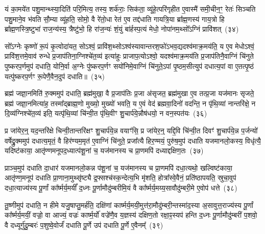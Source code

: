 यं का॒मये॑त पशु॒मान्थ्स्या॒दिति॑ परि॒मित्य॒ तस्य॒ शर्क॑राः॒ सिक॑ता॒ व्यू॑हे॒त्परि॑गृहीत ए॒वास्मै॑ समी॒चीन॒ꣳ॒ रेतः॑ सिञ्चति पशु॒माने॒व भ॑वति सौ॒म्या व्यू॑हति॒ सोमो॒ वै रे॑तो॒धा रेत॑ ए॒व तद्द॑धाति गायत्रि॒या ब्रा᳚ह्म॒णस्य॑ गाय॒त्रो हि ब्रा᳚ह्म॒णस्त्रि॒ष्टुभा॑ राज॒न्य॑स्य॒ त्रैष्टु॑भो॒ हि रा॑ज॒न्यः॑ शं॒युं बा॑र्\mbox{}हस्प॒त्यं मेधो॒ नोपा॑नम॒थ्सो᳚\-ऽग्निं प्रावि॑शत्~(३४)

सो᳚\-ऽग्नेः कृष्णो॑ रू॒पं कृ॒त्वोदा॑यत॒ सो\-ऽश्वं॒ प्रावि॑श॒थ्सो\-ऽश्व॑स्यावान्तरश॒फो॑\-ऽभव॒द्यदश्व॑माक्र॒मय॑ति॒ य ए॒व मेधो\-ऽश्वं॒ प्रावि॑श॒त्तमे॒वाव॑ रुन्धे प्र॒जा\-प॑तिना॒ग्निश्चे॑त॒व्य॑ इत्या॑हुः प्राजाप॒त्यो\-ऽश्वो॒ यदश्व॑माक्र॒मय॑ति प्र॒जा\-प॑तिनै॒वाग्निं चि॑नुते पुष्करप॒र्णमुप॑ दधाति॒ योनि॒र्वा अ॒ग्नेः पु॑ष्करप॒र्णꣳ सयो॑निमे॒वाग्निं चि॑नुते॒\-ऽपां पृ॒ष्ठम॒सीत्युप॑ दधात्य॒पां वा ए॒तत्पृ॒ष्ठं यत्पु॑ष्करप॒र्णꣳ रू॒पेणै॒वैन॒दुप॑ दधाति॥~(३५)

{\anuvakamend[{इन्द्रः॑ प॒शुका॑मस्य भवत्यविश॒थ्सयो॑निं विꣳश॒तिश्च॑}]}%

ब्रह्म॑ जज्ञा॒नमिति॑ रु॒क्ममुप॑ दधाति॒ ब्रह्म॑मुखा॒ वै प्र॒जा\-प॑तिः प्र॒जा अ॑सृजत॒ ब्रह्म॑मुखा ए॒व तत्प्र॒जा यज॑मानः सृजते॒ ब्रह्म॑ जज्ञा॒नमित्या॑ह॒ तस्मा᳚द्ब्राह्म॒णो मुख्यो॒ मुख्यो॑ भवति॒ य ए॒वं वेद॑ ब्रह्मवा॒दिनो॑ वदन्ति॒ न पृ॑थि॒व्यां नान्तरि॑क्षे॒ न दि॒व्य॑ग्निश्चे॑त॒व्य॑ इति॒ यत्पृ॑थि॒व्यां चि॑न्वी॒त पृ॑थि॒वीꣳ शु॒चार्प॑ये॒न्नौष॑धयो॒ न वन॒स्पत॑यः~(३६)

प्र जा॑येर॒न्॒ यद॒न्तरि॑क्षे चिन्वी॒तान्तरि॑क्षꣳ शु॒चार्प॑ये॒न्न वयाꣳ॑सि॒ प्र जा॑येर॒न्॒ यद्दि॒वि चि॑न्वी॒त दिवꣳ॑ शु॒चार्प॑ये॒न्न प॒र्जन्यो॑ वर्\mbox{}षेद्रु॒क्ममुप॑ दधात्य॒मृतं॒ वै हिर॑ण्यम॒मृत॑ ए॒वाग्निं चि॑नुते॒ प्रजा᳚त्यै हिर॒ण्मयं॒ पुरु॑ष॒मुप॑ दधाति यजमानलो॒कस्य॒ विधृ॑त्यै॒ यदिष्ट॑काया॒ आतृ॑ण्णमनूपद॒ध्यात्प॑शू॒नां च॒ यज॑मानस्य च प्रा॒णमपि॑ दध्याद्दक्षिण॒तः~(३७)

प्राञ्च॒मुप॑ दधाति दा॒धार॑ यजमानलो॒कन्न प॑शू॒नां च॒ यज॑मानस्य च प्रा॒णमपि॑ दधा॒त्यथो॒ खल्विष्ट॑काया॒ आतृ॑ण्ण॒मनूप॑ दधाति प्रा॒णाना॒मुथ्सृ॑ष्ट्यै द्र॒फ्सश्च॑स्क॒न्देत्य॒भि मृ॑शति॒ होत्रा᳚स्वे॒वैनं॒ प्रति॑\-ष्ठापयति॒ स्रुचा॒वुप॑ दधा॒त्याज्य॑स्य पू॒र्णां का᳚र्ष्मर्य॒मयीं᳚ द॒ध्नः पू॒र्णामौदु॑म्बरीमि॒यं वै का᳚र्ष्मर्य॒मय्य॒सावौदु॑म्बरी॒मे ए॒वोप॑ धत्ते~(३८)

तू॒ष्णीमुप॑ दधाति॒ न हीमे यजु॒षाप्तु॒मर्\mbox{}ह॑ति॒ दक्षि॑णां कार्ष्मर्य॒मयी॒मुत्त॑रा॒मौदु॑म्बरी॒न्तस्मा॑द॒स्या अ॒सावुत्त॒राज्य॑स्य पू॒र्णां का᳚र्ष्मर्य॒मयीं॒ वज्रो॒ वा आज्यं॒ वज्रः॑ कार्ष्म॒र्यो॑ वज्रे॑णै॒व य॒ज्ञस्य॑ दक्षिण॒तो रक्षा॒ꣴ॒स्यप॑ हन्ति द॒ध्नः पू॒र्णामौदु॑म्बरीं प॒शवो॒ वै दध्यूर्गु॑दु॒म्बरः॑ प॒शुष्वे॒वोर्जं॑ दधाति पू॒र्णे उप॑ दधाति पू॒र्णे ए॒वैनम्᳚~(३९)

